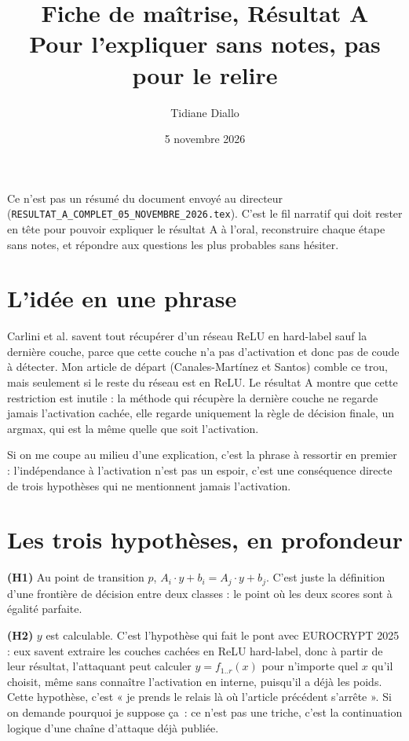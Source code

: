 \documentclass[11pt]{article}
\title{Fiche de maîtrise, Résultat A\\[0.3em]
\large Pour l'expliquer sans notes, pas pour le relire}
\author{Tidiane Diallo}
\date{5 novembre 2026}
\begin{document}
\maketitle

\begin{remarque}
Ce n'est pas un résumé du document envoyé au directeur
(\texttt{RESULTAT\_A\_COMPLET\_05\_NOVEMBRE\_2026.tex}). C'est le fil
narratif qui doit rester en tête pour pouvoir expliquer le résultat A à
l'oral, reconstruire chaque étape sans notes, et répondre aux questions les
plus probables sans hésiter.
\end{remarque}

\section{L'idée en une phrase}

Carlini et al. savent tout récupérer d'un réseau ReLU en hard-label sauf la
dernière couche, parce que cette couche n'a pas d'activation et donc pas de
coude à détecter. Mon article de départ (Canales-Martínez et Santos) comble
ce trou, mais seulement si le reste du réseau est en ReLU. Le résultat A
montre que cette restriction est inutile : la méthode qui récupère la
dernière couche ne regarde jamais l'activation cachée, elle regarde
uniquement la règle de décision finale, un argmax, qui est la même quelle
que soit l'activation.

\begin{cle}
Si on me coupe au milieu d'une explication, c'est la phrase à ressortir en
premier : l'indépendance à l'activation n'est pas un espoir, c'est une
conséquence directe de trois hypothèses qui ne mentionnent jamais
l'activation.
\end{cle}

\section{Les trois hypothèses, en profondeur}

\textbf{(H1)} Au point de transition $p$, $A_i \cdot y + b_i = A_j \cdot y +
b_j$. C'est juste la définition d'une frontière de décision entre deux
classes : le point où les deux scores sont à égalité parfaite.

\textbf{(H2)} $y$ est calculable. C'est l'hypothèse qui fait le pont avec
EUROCRYPT 2025 : eux savent extraire les couches cachées en ReLU hard-label,
donc à partir de leur résultat, l'attaquant peut calculer $y = f_{1..r}(x)$
pour n'importe quel $x$ qu'il choisit, même sans connaître l'activation en
interne, puisqu'il a déjà les poids. Cette hypothèse, c'est « je prends le
relais là où l'article précédent s'arrête ». Si on demande pourquoi je
suppose ça~: ce n'est pas une triche, c'est la continuation logique d'une
chaîne d'attaque déjà publiée.
\end{document}
